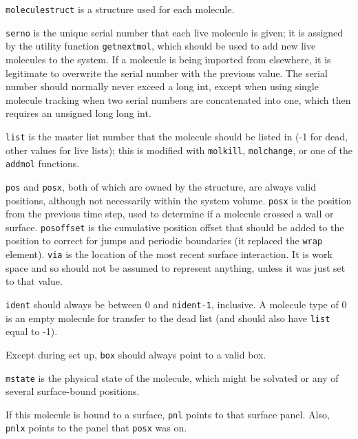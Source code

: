 \documentclass {book}
\newcommand {\ttt} {\texttt}
\begin{document}
\ttt{moleculestruct} is a structure used for each molecule.

\ttt{serno} is the unique serial number that each live molecule is given; it is assigned by the utility function \ttt{getnextmol}, which should be used to add new live molecules to the system. If a molecule is being imported from elsewhere, it is legitimate to overwrite the serial number with the previous value. The serial number should normally never exceed a long int, except when using single molecule tracking when two serial numbers are concatenated into one, which then requires an unsigned long long int.

\ttt{list} is the master list number that the molecule should be listed in (-1 for dead, other values for live lists); this is modified with \ttt{molkill}, \ttt{molchange}, or one of the \ttt{addmol} functions.

\ttt{pos} and \ttt{posx}, both of which are owned by the structure, are always valid positions, although not necessarily within the system volume. \ttt{posx} is the position from the previous time step, used to determine if a molecule crossed a wall or surface. \ttt{posoffset} is the cumulative position offset that should be added to the position to correct for jumps and periodic boundaries (it replaced the \ttt{wrap} element). \ttt{via} is the location of the most recent surface interaction. It is work space and so should not be assumed to represent anything, unless it was just set to that value.

\ttt{ident} should always be between 0 and \ttt{nident-1}, inclusive. A molecule type of 0 is an empty molecule for transfer to the dead list (and should also have \ttt{list} equal to -1).

Except during set up, \ttt{box} should always point to a valid box.

\ttt{mstate} is the physical state of the molecule, which might be solvated or any of several surface-bound positions.

If this molecule is bound to a surface, \ttt{pnl} points to that surface panel. Also, \ttt{pnlx} points to the panel that \ttt{posx} was on.
\end{document}
